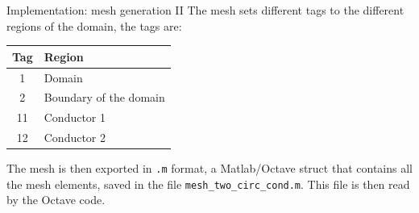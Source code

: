 \documentclass[aspectratio=54,xcolor=dvipsnames]{beamer}
\begin{document}
\begin{frame}{Implementation: mesh generation II}
    The mesh sets different tags to the different regions of the domain, the tags are:
    \begin{center}
        \begin{tabular}{|c|l|}
            \hline
            Tag & Region \\
            \hline
            1 & Domain \\
            2 & Boundary of the domain \\
            11 & Conductor 1 \\
            12 & Conductor 2 \\
            \hline
        \end{tabular}
    \end{center}
    The mesh is then exported in \texttt{.m} format, a Matlab/Octave struct that contains all the mesh elements, saved in the file \texttt{mesh\_two\_circ\_cond.m}. This file is then read by the Octave code.
\end{frame}
\end{document}
